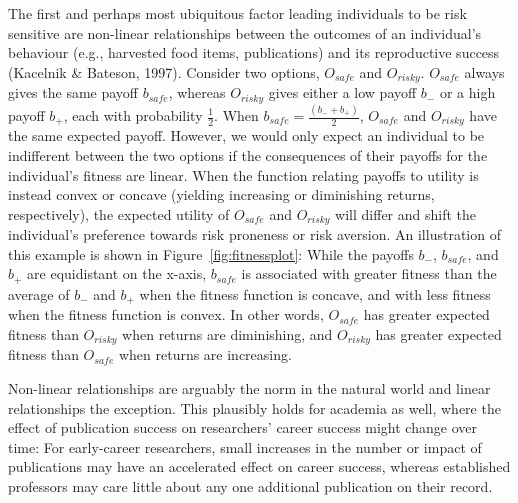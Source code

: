 \documentclass[british,,doc,mask,floatsintext]{apa6}
\begin{document}
The first and perhaps most ubiquitous factor leading individuals to be risk sensitive are non-linear relationships between the outcomes of an individual's behaviour (e.g., harvested food items, publications) and its reproductive success (Kacelnik \& Bateson, 1997).
Consider two options, \(O_{safe}\) and \(O_{risky}\).
\(O_{safe}\) always gives the same payoff \(b_{safe}\), whereas \(O_{risky}\) gives either a low payoff \(b_-\) or a high payoff \(b_+\), each with probability \(\frac{1}{2}\).
When \(b_{safe} = \frac{(b_- + b_+)}{2}\), \(O_{safe}\) and \(O_{risky}\) have the same expected payoff.
However, we would only expect an individual to be indifferent between the two options if the consequences of their payoffs for the individual's fitness are linear.
When the function relating payoffs to utility is instead convex or concave (yielding increasing or diminishing returns, respectively), the expected utility of \(O_{safe}\) and \(O_{risky}\) will differ and shift the individual's preference towards risk proneness or risk aversion.
An illustration of this example is shown in Figure~\ref{fig:fitnessplot}:
While the payoffs \(b_-\), \(b_{safe}\), and \(b_+\) are equidistant on the x-axis, \(b_{safe}\) is associated with greater fitness than the average of \(b_-\) and \(b_+\) when the fitness function is concave, and with less fitness when the fitness function is convex.
In other words, \(O_{safe}\) has greater expected fitness than \(O_{risky}\) when returns are diminishing, and \(O_{risky}\) has greater expected fitness than \(O_{safe}\) when returns are increasing.

Non-linear relationships are arguably the norm in the natural world and linear relationships the exception.
This plausibly holds for academia as well, where the effect of publication success on researchers' career success might change over time:
For early-career researchers, small increases in the number or impact of publications may have an accelerated effect on career success, whereas established professors may care little about any one additional publication on their record.
\end{document}
